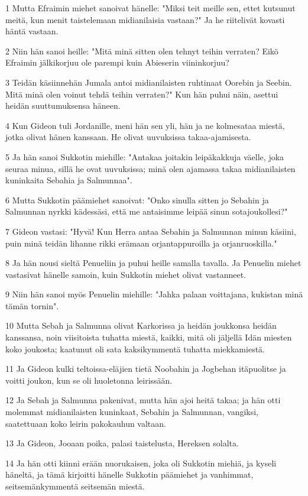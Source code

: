 \par 1 Mutta Efraimin miehet sanoivat hänelle: "Miksi teit meille sen, ettet kutsunut meitä, kun menit taistelemaan midianilaisia vastaan?" Ja he riitelivät kovasti häntä vastaan.
\par 2 Niin hän sanoi heille: "Mitä minä sitten olen tehnyt teihin verraten? Eikö Efraimin jälkikorjuu ole parempi kuin Abieserin viininkorjuu?
\par 3 Teidän käsiinnehän Jumala antoi midianilaisten ruhtinaat Oorebin ja Seebin. Mitä minä olen voinut tehdä teihin verraten?" Kun hän puhui näin, asettui heidän suuttumuksensa häneen.
\par 4 Kun Gideon tuli Jordanille, meni hän sen yli, hän ja ne kolmesataa miestä, jotka olivat hänen kanssaan. He olivat uuvuksissa takaa-ajamisesta.
\par 5 Ja hän sanoi Sukkotin miehille: "Antakaa joitakin leipäkakkuja väelle, joka seuraa minua, sillä he ovat uuvuksissa; minä olen ajamassa takaa midianilaisten kuninkaita Sebahia ja Salmunnaa".
\par 6 Mutta Sukkotin päämiehet sanoivat: "Onko sinulla sitten jo Sebahin ja Salmunnan nyrkki kädessäsi, että me antaisimme leipää sinun sotajoukollesi?"
\par 7 Gideon vastasi: "Hyvä! Kun Herra antaa Sebahin ja Salmunnan minun käsiini, puin minä teidän lihanne rikki erämaan orjantappuroilla ja orjanruoskilla."
\par 8 Ja hän nousi sieltä Penueliin ja puhui heille samalla tavalla. Ja Penuelin miehet vastasivat hänelle samoin, kuin Sukkotin miehet olivat vastanneet.
\par 9 Niin hän sanoi myös Penuelin miehille: "Jahka palaan voittajana, kukistan minä tämän tornin".
\par 10 Mutta Sebah ja Salmunna olivat Karkorissa ja heidän joukkonsa heidän kanssansa, noin viisitoista tuhatta miestä, kaikki, mitä oli jäljellä Idän miesten koko joukosta; kaatunut oli sata kaksikymmentä tuhatta miekkamiestä.
\par 11 Ja Gideon kulki teltoissa-eläjien tietä Noobahin ja Jogbehan itäpuolitse ja voitti joukon, kun se oli huoletonna leirissään.
\par 12 Ja Sebah ja Salmunna pakenivat, mutta hän ajoi heitä takaa; ja hän otti molemmat midianilaisten kuninkaat, Sebahin ja Salmunnan, vangiksi, saatettuaan koko leirin pakokauhun valtaan.
\par 13 Ja Gideon, Jooaan poika, palasi taistelusta, Hereksen solalta.
\par 14 Ja hän otti kiinni erään nuorukaisen, joka oli Sukkotin miehiä, ja kyseli häneltä, ja tämä kirjoitti hänelle Sukkotin päämiehet ja vanhimmat, seitsemänkymmentä seitsemän miestä.
